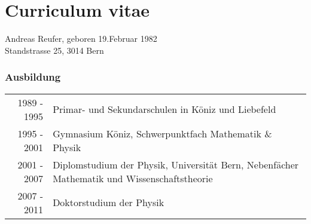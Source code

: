 

\chapter*{Curriculum vitae}

{ \large Andreas Reufer, geboren 19.Februar 1982} \\
{ \large Standstrasse 25, 3014 Bern} \\

\subsection*{Ausbildung}
\begin{tabular}{rp{12.0cm}}
1989 - 1995 & Primar- und Sekundarschulen in Köniz und Liebefeld\\
1995 - 2001 & Gymnasium Köniz, Schwerpunktfach Mathematik \& Physik \\
2001 - 2007 & Diplomstudium der Physik, Universität Bern, Nebenfächer Mathematik und Wissenschaftstheorie \\
2007 - 2011 & Doktorstudium der Physik \\
\end{tabular}


